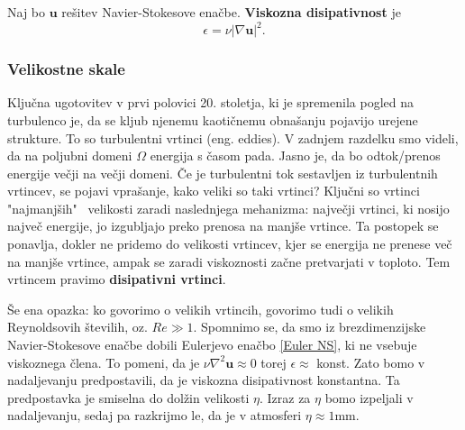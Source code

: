 \documentclass[mat2, tisk]{fmfdelo}
\newcommand{\bd}{\textbf}
\begin{document}
\begin{definicija}
Naj bo $\bd{u}$ rešitev Navier-Stokesove enačbe. \textbf{Viskozna disipativnost} je 
\begin{equation}
\label{def:disipativnost}
\epsilon = \nu|\nabla \bd{u}|^2.
\end{equation}
\end{definicija}

\subsubsection{Velikostne skale}
Ključna ugotovitev v prvi polovici 20. stoletja, ki je spremenila pogled
na turbulenco je, da se kljub njenemu kaotičnemu obnašanju pojavijo urejene strukture. 
To so turbulentni vrtinci (eng. eddies). V zadnjem razdelku smo videli, da na poljubni domeni 
$\Omega$ energija s časom pada. Jasno je, da bo odtok/prenos energije večji na večji domeni. Če je turbulentni 
tok sestavljen iz turbulentnih vrtincev, se pojavi vprašanje, kako veliki so taki vrtinci? 
Ključni so vrtinci "najmanjših" \, velikosti zaradi naslednjega mehanizma:
največji vrtinci, ki nosijo največ energije, jo izgubljajo preko prenosa na manjše vrtince. Ta postopek se ponavlja, dokler 
ne pridemo do velikosti vrtincev, kjer se energija ne prenese več na manjše vrtince, 
ampak se zaradi viskoznosti začne pretvarjati v toploto. Tem vrtincem pravimo \textbf{disipativni vrtinci}.

Še ena opazka: ko govorimo o velikih vrtincih, govorimo tudi o velikih Reynoldsovih 
številih, oz. $Re \gg 1$. Spomnimo se, da smo iz brezdimenzijske Navier-Stokesove enačbe 
dobili Eulerjevo enačbo \eqref{Euler NS}, ki ne vsebuje viskoznega člena. To pomeni, da je 
$\nu \nabla^2 \bd{u} \approx 0$ torej $\epsilon \approx$ konst. Zato bomo v 
nadaljevanju predpostavili, da je viskozna disipativnost konstantna. Ta predpostavka je 
smiselna do dolžin velikosti $\eta$. Izraz za $\eta$ bomo izpeljali v nadaljevanju, sedaj 
pa razkrijmo le, da je v atmosferi $\eta \approx 1$mm.\\
\end{document}
